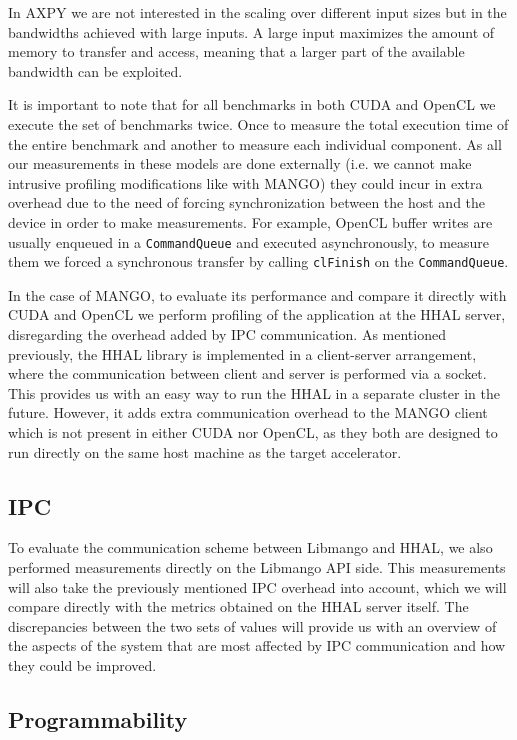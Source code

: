 In AXPY we are not interested in the scaling over different input sizes but in the bandwidths achieved with large inputs. A large input maximizes the amount of memory to transfer and access, meaning that a larger part of the available bandwidth can be exploited.

It is important to note that for all benchmarks in both CUDA and OpenCL we execute the set of benchmarks twice. Once to measure the total execution time of the entire benchmark and another to measure each individual component. As all our measurements in these models are done externally (i.e. we cannot make intrusive profiling modifications like with MANGO) they could incur in extra overhead due to the need of forcing synchronization between the host and the device in order to make measurements. For example, OpenCL buffer writes are usually enqueued in a \texttt{CommandQueue} and executed asynchronously, to measure them we forced a synchronous transfer by calling \texttt{clFinish} on the \texttt{CommandQueue}.

In the case of MANGO, to evaluate its performance and compare it directly with CUDA and OpenCL we perform profiling of the application at the HHAL server, disregarding the overhead added by IPC communication. As mentioned previously, the HHAL library is implemented in a client-server arrangement, where the communication between client and server is performed via a socket. This provides us with an easy way to run the HHAL in a separate cluster in the future. However, it adds extra communication overhead to the MANGO client which is not present in either CUDA nor OpenCL, as they both are designed to run directly on the same host machine as the target accelerator.

\subsection{IPC}
To evaluate the communication scheme between Libmango and HHAL, we also performed measurements directly on the Libmango API side. This measurements will also take the previously mentioned IPC overhead into account, which we will compare directly with the metrics obtained on the HHAL server itself. The discrepancies between the two sets of values will provide us with an overview of the aspects of the system that are most affected by IPC communication and how they could be improved.

\subsection{Programmability}

